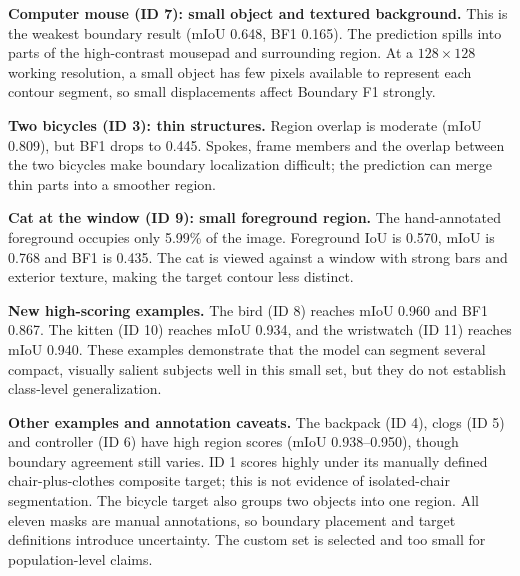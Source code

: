 \documentclass[10pt,a4paper,twocolumn]{article}
\begin{document}
\textbf{Computer mouse (ID 7): small object and textured background.} This is the weakest boundary result (mIoU 0.648, BF1 0.165). The prediction spills into parts of the high-contrast mousepad and surrounding region. At a $128{\times}128$ working resolution, a small object has few pixels available to represent each contour segment, so small displacements affect Boundary F1 strongly.

\textbf{Two bicycles (ID 3): thin structures.} Region overlap is moderate (mIoU 0.809), but BF1 drops to 0.445. Spokes, frame members and the overlap between the two bicycles make boundary localization difficult; the prediction can merge thin parts into a smoother region.

\textbf{Cat at the window (ID 9): small foreground region.} The hand-annotated foreground occupies only 5.99\% of the image. Foreground IoU is 0.570, mIoU is 0.768 and BF1 is 0.435. The cat is viewed against a window with strong bars and exterior texture, making the target contour less distinct.

\textbf{New high-scoring examples.} The bird (ID 8) reaches mIoU 0.960 and BF1 0.867. The kitten (ID 10) reaches mIoU 0.934, and the wristwatch (ID 11) reaches mIoU 0.940. These examples demonstrate that the model can segment several compact, visually salient subjects well in this small set, but they do not establish class-level generalization.

\textbf{Other examples and annotation caveats.} The backpack (ID 4), clogs (ID 5) and controller (ID 6) have high region scores (mIoU 0.938--0.950), though boundary agreement still varies. ID 1 scores highly under its manually defined chair-plus-clothes composite target; this is not evidence of isolated-chair segmentation. The bicycle target also groups two objects into one region. All eleven masks are manual annotations, so boundary placement and target definitions introduce uncertainty. The custom set is selected and too small for population-level claims.

\end{document}
